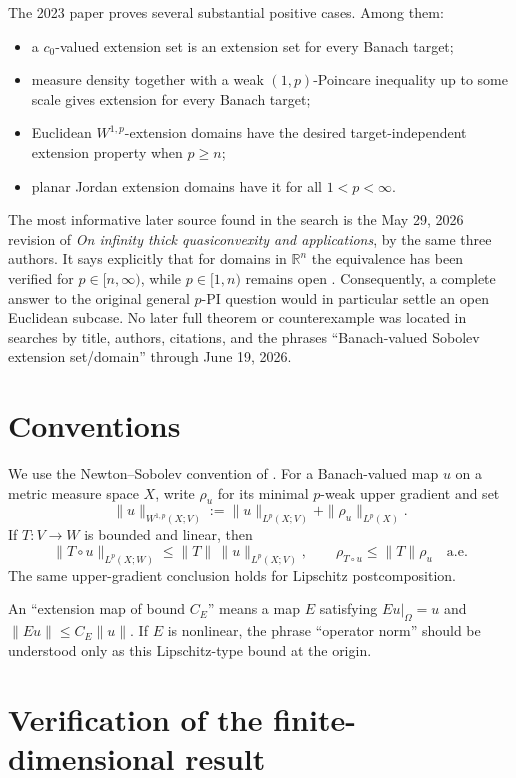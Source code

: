 \documentclass[11pt]{article}
\theoremstyle{remark}
\newcommand{\R}{\mathbb{R}}
\newcommand{\Om}{\Omega}
\newcommand{\Lp}{L^p}
\newcommand{\Wp}{W^{1,p}}
\newcommand{\rhoMin}[1]{\rho_{#1}}
\newcommand{\restr}[2]{#1\vert_{#2}}
\begin{document}
The 2023 paper proves several substantial positive cases.  Among them:
\begin{itemize}[leftmargin=2em,itemsep=2pt]
  \item a $c_0$-valued extension set is an extension set for every Banach
  target;
  \item measure density together with a weak $(1,p)$-Poincare inequality up
  to some scale gives extension for every Banach target;
  \item Euclidean $\Wp$-extension domains have the desired target-independent
  extension property when $p\ge n$;
  \item planar Jordan extension domains have it for all $1<p<\infty$.
\end{itemize}

The most informative later source found in the search is the May 29, 2026
revision of \emph{On infinity thick quasiconvexity and applications}, by the
same three authors.  It says explicitly that for domains in $\R^n$ the
equivalence has been verified for $p\in[n,\infty)$, while
$p\in[1,n)$ remains open \cite{GBIZ26}.  Consequently, a complete answer to
the original general $p$-PI question would in particular settle an open
Euclidean subcase.  No later full theorem or counterexample was located in
searches by title, authors, citations, and the phrases ``Banach-valued
Sobolev extension set/domain'' through June 19, 2026.

\section{Conventions}

We use the Newton--Sobolev convention of \cite{GBIZ23}.  For a Banach-valued
map $u$ on a metric measure space $X$, write $\rhoMin{u}$ for its minimal
$p$-weak upper gradient and set
\[
  \|u\|_{\Wp(X;V)}
  :=\|u\|_{\Lp(X;V)}+\|\rhoMin{u}\|_{\Lp(X)}.
\]
If $T:V\to W$ is bounded and linear, then
\[
  \|T\circ u\|_{\Lp(X;W)}\le \|T\|\,\|u\|_{\Lp(X;V)},
  \qquad
  \rhoMin{T\circ u}\le \|T\|\rhoMin{u}
  \quad\text{a.e.}
\]
The same upper-gradient conclusion holds for Lipschitz postcomposition.

An ``extension map of bound $C_E$'' means a map $E$ satisfying
$\restr{Eu}{\Om}=u$ and $\|Eu\|\le C_E\|u\|$.  If $E$ is nonlinear, the
phrase ``operator norm'' should be understood only as this Lipschitz-type
bound at the origin.

\section{Verification of the finite-dimensional result}
\end{document}
